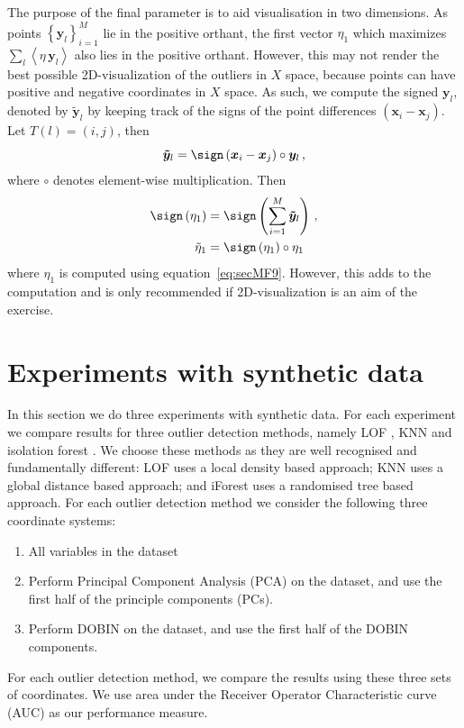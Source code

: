 \documentclass[a4paper,11pt]{article}
\begin{document}
The purpose of the final parameter is to aid visualisation in two dimensions. As points $ \left\{ \bm{y}_{l} \right \}_{i=1}^M$ lie in the positive orthant, the first vector $\eta_1$ which maximizes $\sum_l \left\langle \eta\, \bm{y}_l \right\rangle$ also lies in the positive orthant. However, this may not render the best possible 2D-visualization of the outliers in $X$ space, because points can have positive and negative coordinates in  $X$ space. As such, we compute the signed $\bm{y}_{l}$, denoted by $\bm{\tilde{y}}_l$ by keeping track of the signs of the point differences $\left( \bm{x}_i - \bm{x}_j \right)$. Let $T(l) = \left( i, j \right)$, then 
\begin{equation}\label{eq:secMF16}
    \bm{\tilde{y}}_l = \sign\left( \bm{x}_i - \bm{x}_j \right) \circ \bm{y}_{l}  \, , 
\end{equation}
where $\circ$ denotes element-wise multiplication. Then 
\begin{align}\label{eq:secMF17}
    \sign \left(\eta_1 \right) & = \sign \left( \sum_{i=1}^M  \bm{\tilde{y}}_l \right) \, , \notag \\
    \tilde\eta_1 & = \sign \left(\eta_1 \right) \circ \eta_1 
\end{align}
 where $\eta_1 $ is computed using equation~\eqref{eq:secMF9}. However, this adds to the computation and is only recommended if 2D-visualization is an aim of the exercise. 

\section{Experiments with synthetic data}\label{sec:synthetic}
In this section we do three experiments with synthetic data. For each experiment we compare results for three outlier detection methods, namely LOF \citep{breunig2000lof}, KNN \citep{ramaswamy2000efficient} and isolation forest \citep{liu2008isolation}. We choose these methods as they are well recognised and fundamentally different: LOF uses a local density based approach; KNN uses a global distance based approach; and iForest uses a randomised tree based approach.  For each outlier detection method we consider the following three coordinate systems:  
\begin{enumerate}  
\item All variables in the dataset
\item Perform Principal Component Analysis (PCA) on the dataset, and use the first half of the principle components (PCs).
\item Perform DOBIN on the dataset, and use the first half of the DOBIN components. 
\end{enumerate}
For each outlier detection method, we compare the results using these three sets of coordinates. We use area under the Receiver Operator Characteristic curve (AUC) as our performance measure. 
\end{document}
